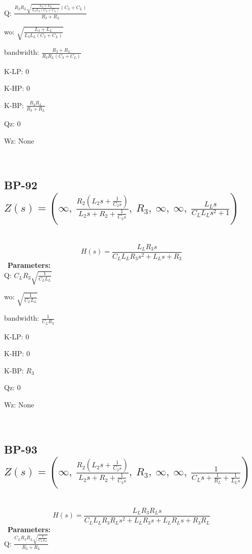 \documentclass{article}
\begin{document}
Q: $\frac{R_{3} R_{L} \sqrt{\frac{L_{3} + L_{L}}{L_{3} L_{L} \left(C_{3} + C_{L}\right)}} \left(C_{3} + C_{L}\right)}{R_{3} + R_{L}}$\ 

wo: $\sqrt{\frac{L_{3} + L_{L}}{L_{3} L_{L} \left(C_{3} + C_{L}\right)}}$\ 

bandwidth: $\frac{R_{3} + R_{L}}{R_{3} R_{L} \left(C_{3} + C_{L}\right)}$\ 

K-LP: $0$\ 

K-HP: $0$\ 

K-BP: $\frac{R_{3} R_{L}}{R_{3} + R_{L}}$\ 

Qz: $0$\ 

Wz: $\text{None}$\ 

\ 

\subsection{BP-92 $Z(s) = \left( \infty, \  \frac{R_{2} \left(L_{2} s + \frac{1}{C_{2} s}\right)}{L_{2} s + R_{2} + \frac{1}{C_{2} s}}, \  R_{3}, \  \infty, \  \infty, \  \frac{L_{L} s}{C_{L} L_{L} s^{2} + 1}\right)$ } \ 
\textbf{\[H(s) = \frac{L_{L} R_{3} s}{C_{L} L_{L} R_{3} s^{2} + L_{L} s + R_{3}}\] } \ 
\textbf{Parameters:}\\ 

Q: $C_{L} R_{3} \sqrt{\frac{1}{C_{L} L_{L}}}$\ 

wo: $\sqrt{\frac{1}{C_{L} L_{L}}}$\ 

bandwidth: $\frac{1}{C_{L} R_{3}}$\ 

K-LP: $0$\ 

K-HP: $0$\ 

K-BP: $R_{3}$\ 

Qz: $0$\ 

Wz: $\text{None}$\ 

\ 

\subsection{BP-93 $Z(s) = \left( \infty, \  \frac{R_{2} \left(L_{2} s + \frac{1}{C_{2} s}\right)}{L_{2} s + R_{2} + \frac{1}{C_{2} s}}, \  R_{3}, \  \infty, \  \infty, \  \frac{1}{C_{L} s + \frac{1}{R_{L}} + \frac{1}{L_{L} s}}\right)$ } \ 
\textbf{\[H(s) = \frac{L_{L} R_{3} R_{L} s}{C_{L} L_{L} R_{3} R_{L} s^{2} + L_{L} R_{3} s + L_{L} R_{L} s + R_{3} R_{L}}\] } \ 
\textbf{Parameters:}\\ 

Q: $\frac{C_{L} R_{3} R_{L} \sqrt{\frac{1}{C_{L} L_{L}}}}{R_{3} + R_{L}}$\ 
\end{document}
